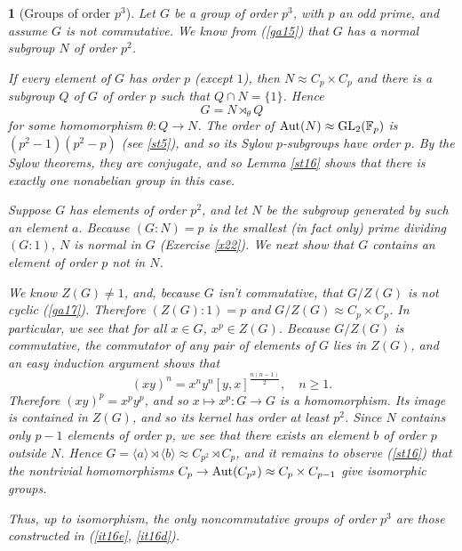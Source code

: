 \documentclass[a4paper,11pt,final]{memoir}%
\newtheorem{plain}[X]{}
\theoremstyle{nonumberplain}
\begin{document}
\begin{plain}
[Groups of order $p^{3}$]\label{st19}%
%
Let $G$ be a group of order $p^{3}$, with $p$ an odd prime, and assume $G$ is
not commutative. We know from (\ref{ga15}) that $G$ has a normal subgroup $N$
of order $p^{2}$.

If every element of $G$ has order $p$ (except $1$), then $N\approx C_{p}\times
C_{p}$ and there is a subgroup $Q$ of $G$ of order $p$ such that $Q\cap
N=\{1\}$. Hence
\[
G=N\rtimes_{\theta}Q
\]
for some homomorphism $\theta\colon Q\rightarrow N$. The order of
$\operatorname{Aut}(N)\approx\operatorname{GL}_{2}(\mathbb{F}{}_{p})$ is $(p^{2}-1)(p^{2}-p)$ (see
\ref{st5}), and so its Sylow $p$-subgroups have order $p$. By the Sylow
theorems, they are conjugate, and so Lemma \ref{st16} shows that there is
exactly one nonabelian group in this case.

Suppose $G$ has elements of order $p^{2}$, and let $N$ be the subgroup
generated by such an element $a$. Because $(G:N)=p$ is the smallest (in fact
only) prime dividing $(G:1)$, $N$ is normal in $G$ (Exercise \ref{x22}). We
next show that $G$ contains an element of order $p$ not in $N$.

We know $Z(G)\neq1$, and, because $G$ isn't commutative, that $G/Z(G)$ is not
cyclic (\ref{ga17}). Therefore $(Z(G):1)=p$ and $G/Z(G)\approx C_{p}\times
C_{p}$. In particular, we see that for all $x\in G$, $x^{p}\in Z(G)$. Because
$G/Z(G)$ is commutative, the commutator of any pair of elements of $G$ lies in
$Z(G)$, and an easy induction argument shows that
\[
(xy)^{n}=x^{n}y^{n}[y,x]^{\frac{n(n-1)}{2}},\quad n\geq1.
\]
Therefore $(xy)^{p}=x^{p}y^{p}$, and so $x\mapsto x^{p}\colon G\rightarrow G$
is a homomorphism. Its image is contained in $Z(G)$, and so its kernel has
order at least $p^{2}$. Since $N$ contains only $p-1$ elements of order $p$,
we see that there exists an element $b$ of order $p$ outside $N$. Hence
$G=\langle a\rangle\rtimes\langle b\rangle\approx C_{p^{2}}\rtimes C_{p}$, and
it remains to observe (\ref{st16}) that the nontrivial homomorphisms
$C_{p}\rightarrow\operatorname{Aut}(C_{p^{2}})\approx C_{p}\times C_{p-1}$ give isomorphic groups.

Thus, up to isomorphism, the only noncommutative groups of order $p^{3}$ are
those constructed in (\ref{it16e}, \ref{it16d}).
\end{plain}
\end{document}
